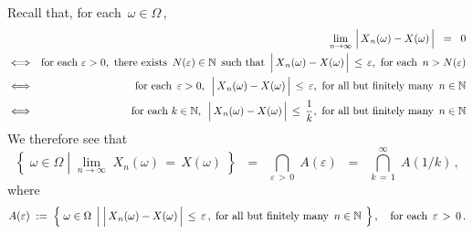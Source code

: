 \vskip 0.3cm
\noindent
Recall that, for each \,$\omega \in \Omega$\,,
\begin{eqnarray*}
&&
	\underset{n\rightarrow\infty}{\lim}\,
	\left\vert\,\overset{{\color{white}.}}{X}_{n}(\omega) - X(\omega)\,\right\vert
	\;\; = \;\;0
\\
& \Longleftrightarrow &
	\textnormal{for each $\varepsilon > 0$,\, there exists \,$N(\varepsilon) \in \N$\, such that
	\,$\left\vert\,\overset{{\color{white}.}}{X}_{n}(\omega) - X(\omega)\,\right\vert \,\leq\, \varepsilon$,\,
	for each \,$n > N(\varepsilon)$}
\\
& \Longleftrightarrow &
	\textnormal{for each \,$\varepsilon > 0$,\,
	\,$\left\vert\,\overset{{\color{white}.}}{X}_{n}(\omega) - X(\omega)\,\right\vert \,\leq\, \varepsilon$,\,
	for all but finitely many \,$n \in \N$}
\\
& \Longleftrightarrow &
	\textnormal{for each $k \in \N$,\,
	\,$\left\vert\,\overset{{\color{white}.}}{X}_{n}(\omega) - X(\omega)\,\right\vert \,\leq\, \dfrac{1}{k}$,\,
	for all but finitely many \,$n \in \N$}
\end{eqnarray*}
We therefore see that
\begin{equation*}
\!\left\{\;
	\omega \in \Omega
	\;\left\vert\;
	\underset{n\rightarrow\infty}{\lim}\;X_{n}(\omega) \,=\, X(\omega)
	\right.
	\;\right\}
\;\; = \;\;
	\underset{\varepsilon\,>\,0}{\bigcap}\; A(\varepsilon)
\;\; = \;\;
	\overset{\infty}{\underset{k\,=\,1}{\bigcap}}\; A(1/k)\,,
\end{equation*}
where
\begin{equation*}
A(\varepsilon)
\; := \;
	\left\{\;
		\omega \in \Omega
		\;\left\vert\;
		\left\vert\,\overset{{\color{white}.}}{X}_{n}(\omega) - X(\omega)\,\right\vert \,\leq\, \varepsilon\,,\;
		\textnormal{for all but finitely many \,$n \in \N$}
		\right.
		\;\right\},
\quad\textnormal{for each \,$\varepsilon \,>\, 0$}\,.
\end{equation*}

